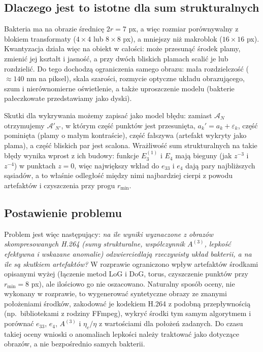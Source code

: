 \documentclass[12pt,a4paper,twoside,openright]{report}
\theoremstyle{definition}
\theoremstyle{remark}
\begin{document}
{\subsection{Dlaczego jest to istotne dla sum strukturalnych}
Bakteria ma na obrazie średnicę $2r=7$ px, a więc rozmiar porównywalny z blokiem transformaty ($4\times4$ lub $8\times8$ px), a mniejszy niż makroblok ($16\times16$ px). Kwantyzacja działa więc na obiekt w całości: może przesunąć środek plamy, zmienić jej kształt i jasność, a przy dwóch bliskich plamach scalić je lub rozdzielić. Do tego dochodzą ograniczenia samego obrazu: mała rozdzielczość ($\approx140$ nm na piksel), skala szarości, rozmycie optyczne układu obrazującego, szum i nierównomierne oświetlenie, a także uproszczenie modelu (bakterie pałeczkowate przedstawiamy jako dyski).

Skutki dla wykrywania możemy zapisać jako model błędu: zamiast $\mathcal A_N$ otrzymujemy $\mathcal A'_{N'}$, w którym część punktów jest przesunięta, $a_k'=a_k+\varepsilon_k$, część pominięta (plamy o małym kontraście), część fałszywa (artefakt wykryty jako plama), a część bliskich par jest scalona. Wrażliwość sum strukturalnych na takie błędy wynika wprost z ich budowy: funkcje $E_3^{(1)}$ i $E_4$ mają bieguny (jak $z^{-3}$ i $z^{-4}$) w punktach $z=0$, więc największy wkład do $e_{33}$ i $e_4$ dają pary najbliższych sąsiadów, a to właśnie odległość między nimi najbardziej cierpi z powodu artefaktów i czyszczenia przy progu $r_{\min}$.

\subsection{Postawienie problemu}
Problem jest więc następujący: \emph{na ile wyniki wyznaczone z obrazów skompresowanych H.264 (sumy strukturalne, współczynnik $A^{(3)}$, lepkość efektywna i wskazane anomalie) odzwierciedlają rzeczywisty układ bakterii, a na ile są skutkiem artefaktów?} W rozprawie ograniczono wpływ artefaktów środkami opisanymi wyżej (łączenie metod LoG i DoG, torus, czyszczenie punktów przy $r_{\min}=8$ px), ale ilościowo go nie oszacowano. Naturalny sposób oceny, nie wykonany w rozprawie, to wygenerować syntetyczne obrazy ze znanymi położeniami środków, zakodować je kodekiem H.264 z podobną przepływnością (np.\ bibliotekami z rodziny FFmpeg), wykryć środki tym samym algorytmem i porównać $e_{33}$, $e_4$, $A^{(3)}$ i $\eta_e/\eta$ z wartościami dla położeń zadanych. Do czasu takiej oceny wnioski o anomaliach lepkości należy traktować jako dotyczące obrazów, a nie bezpośrednio samych bakterii.
}
\end{document}
